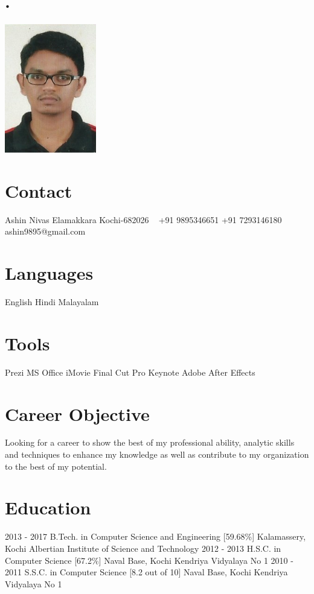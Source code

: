 \documentclass[]{cv-style} %
\begin{document}
\begin{aside}
\section{.}
\includegraphics[width=4cm]{Scan.jpeg}
\section{Contact}
Ashin Nivas
Elamakkara
Kochi-682026
~
+91 9895346651
+91 7293146180
~
ashin9895@gmail.com
\section{Languages}
English
Hindi
Malayalam
\section{Tools}
Prezi
MS Office
iMovie
Final Cut Pro
Keynote
Adobe After Effects
\end{aside}
\section{Career Objective}
  \vspace{-0.2cm}
Looking for a career to show the best of my professional ability, analytic skills and techniques to enhance my knowledge as well as contribute to my organization to the best of my potential.

\section{Education}
\begin{entrylist}
\entry
{2013 - 2017}
{B.Tech. {\normalfont in Computer Science and Engineering [59.68\%]}}
{Kalamassery, Kochi}
{Albertian Institute of Science and Technology}
\entry
{2012 - 2013}
{H.S.C. {\normalfont in Computer Science [67.2\%]}}
{Naval Base, Kochi}
{Kendriya Vidyalaya No 1}
\entry
{2010 - 2011}
{S.S.C. {\normalfont in Computer Science [8.2 out of 10]}}
{Naval Base, Kochi}
{Kendriya Vidyalaya No 1}
\end{entrylist} 
\end{document}
